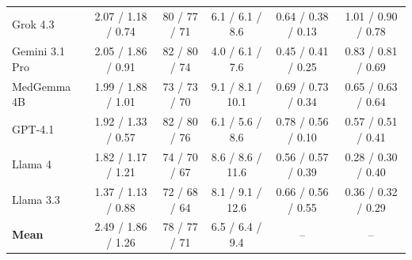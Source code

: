 \begin{table}[ht]
\begin{tabular}{lccccc}
Grok 4.3 & 2.07 / 1.18 / 0.74 & 80 / 77 / 71 & 6.1 / 6.1 / 8.6 & 0.64 / 0.38 / 0.13 & 1.01 / 0.90 / 0.78 \\
Gemini 3.1 Pro & 2.05 / 1.86 / 0.91 & 82 / 80 / 74 & 4.0 / 6.1 / 7.6 & 0.45 / 0.41 / 0.25 & 0.83 / 0.81 / 0.69 \\
MedGemma 4B & 1.99 / 1.88 / 1.01 & 73 / 73 / 70 & 9.1 / 8.1 / 10.1 & 0.69 / 0.73 / 0.34 & 0.65 / 0.63 / 0.64 \\
GPT-4.1 & 1.92 / 1.33 / 0.57 & 82 / 80 / 76 & 6.1 / 5.6 / 8.6 & 0.78 / 0.56 / 0.10 & 0.57 / 0.51 / 0.41 \\
Llama 4 & 1.82 / 1.17 / 1.21 & 74 / 70 / 67 & 8.6 / 8.6 / 11.6 & 0.56 / 0.57 / 0.39 & 0.28 / 0.30 / 0.40 \\
Llama 3.3 & 1.37 / 1.13 / 0.88 & 72 / 68 / 64 & 8.1 / 9.1 / 12.6 & 0.66 / 0.56 / 0.55 & 0.36 / 0.32 / 0.29 \\
\midrule
\textbf{Mean} & 2.49 / 1.86 / 1.26 & 78 / 77 / 71 & 6.5 / 6.4 / 9.4 & -- & -- \\
\bottomrule
\end{tabular}
\end{table}
